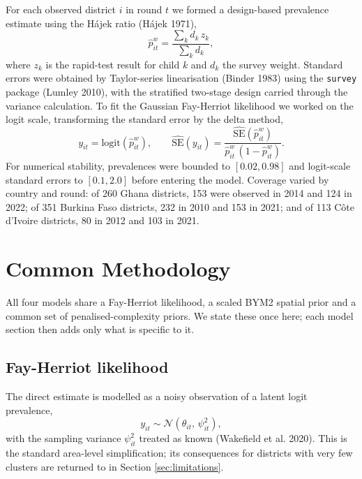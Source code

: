 \documentclass{article}
\begin{document}
For each observed district \(i\) in round \(t\) we formed a design-based
prevalence estimate using the Hájek ratio (Hájek 1971), \begin{equation}
\hat{p}_{it}^{w} = \frac{\sum_k d_k\, z_k}{\sum_k d_k},
\end{equation} where \(z_k\) is the rapid-test result for child \(k\)
and \(d_k\) the survey weight. Standard errors were obtained by
Taylor-series linearisation (Binder 1983) using the \texttt{survey}
package (Lumley 2010), with the stratified two-stage design carried
through the variance calculation. To fit the Gaussian Fay-Herriot
likelihood we worked on the logit scale, transforming the standard error
by the delta method, \begin{equation}
y_{it} = \mathrm{logit}\!\left(\hat{p}_{it}^{w}\right),
\qquad
\widehat{\mathrm{SE}}(y_{it}) =
\frac{\widehat{\mathrm{SE}}(\hat{p}_{it}^{w})}
     {\hat{p}_{it}^{w}\,(1 - \hat{p}_{it}^{w})}.
\end{equation} For numerical stability, prevalences were bounded to
\([0.02, 0.98]\) and logit-scale standard errors to \([0.1, 2.0]\)
before entering the model. Coverage varied by country and round: of 260
Ghana districts, 153 were observed in 2014 and 124 in 2022; of 351
Burkina Faso districts, 232 in 2010 and 153 in 2021; and of 113 Côte
d'Ivoire districts, 80 in 2012 and 103 in 2021.

\section{Common Methodology}\label{sec:methods}

All four models share a Fay-Herriot likelihood, a scaled BYM2 spatial
prior and a common set of penalised-complexity priors. We state these
once here; each model section then adds only what is specific to it.

\subsection{Fay-Herriot likelihood}\label{fay-herriot-likelihood}

The direct estimate is modelled as a noisy observation of a latent logit
prevalence, \begin{equation}
y_{it} \sim \mathcal{N}\!\left(\theta_{it},\, \psi_{it}^2\right),
\end{equation} with the sampling variance \(\psi_{it}^2\) treated as
known (Wakefield et al. 2020). This is the standard area-level
simplification; its consequences for districts with very few clusters
are returned to in Section \ref{sec:limitations}.
\end{document}
